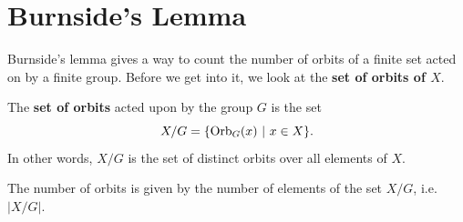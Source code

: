\section{Burnside's Lemma}
Burnside's lemma gives a way to count the number of orbits of a finite set acted on by a finite group. Before we get into it, we look at the \textbf{set of orbits of $X$}.

\begin{definition}
    The \textbf{set of orbits} acted upon by the group $G$ is the set
    \[
        X / G = \{\mathrm{Orb}_{G}(x) \ | \ x \in X\}.
    \]
    In other words, $X/G$ is the set of distinct orbits over all elements of $X$.
\end{definition}
\begin{remark}
    The number of orbits is given by the number of elements of the set $X/G$, i.e. $|X/G|$.
\end{remark}

